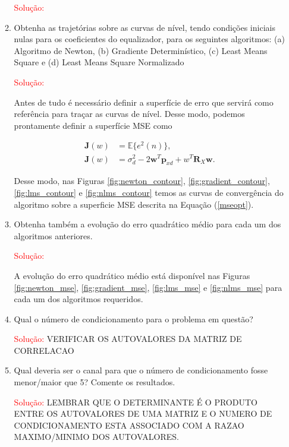 \documentclass[a4paper,10pt]{article}
\begin{document}
\begin{enumerate}
\begin{enumerate}
						\textcolor{red}{Solução:}
					
					\newpage
					\item Obtenha as trajetórias sobre as curvas de nível, tendo condições iniciais nulas para os coeﬁcientes do equalizador, para os seguintes algoritmos: (a) Algoritmo de Newton, (b) Gradiente Determinístico, (c) Least Means Square e (d) Least Means Square Normalizado
						
						\textcolor{red}{Solução:}
						
						Antes de tudo é necessário definir a superfície de erro que servirá como referência para traçar as curvas de nível. Desse modo, podemos prontamente
						definir a superfície MSE como
						
						\begin{align}
							\mathbf{J}(w) &= \mathbb{E}\{e^{2}(n)\}, \\
							\mathbf{J}(w) &= \sigma^{2}_{d} - 2\mathbf{w}^{T}\mathbf{p}_{xd} + w^{T}\mathbf{R}_{X}\mathbf{w}. \label{mseopt}  
						\end{align}
						
						Desse modo, nas Figuras \ref{fig:newton_contour}, \ref{fig:gradient_contour}, \ref{fig:lms_contour} e \ref{fig:nlms_contour} temos as curvas de convergência do algoritmo sobre a superficie MSE descrita na Equação (\ref{mseopt}). 

					\item Obtenha também a evolução do erro quadrático médio para cada um dos algoritmos anteriores.
						
						\textcolor{red}{Solução:}

						A evolução do erro quadrático médio está disponível nas Figuras \ref{fig:newton_mse}, \ref{fig:gradient_mse}, \ref{fig:lms_mse} e \ref{fig:nlms_mse} para cada um dos algoritmos requeridos.
					\item Qual o número de condicionamento para o problema em questão?
					
						\textcolor{red}{Solução:}
						VERIFICAR OS AUTOVALORES DA MATRIZ DE CORRELACAO
					
					\item Qual deveria ser o canal para que o número de condicionamento fosse menor/maior que 5?
					Comente os resultados.
					
						\textcolor{red}{Solução:}
						LEMBRAR QUE O DETERMINANTE É O PRODUTO ENTRE OS AUTOVALORES DE UMA MATRIZ E O NUMERO DE CONDICIONAMENTO ESTA ASSOCIADO COM A RAZAO MAXIMO/MINIMO DOS AUTOVALORES.
						

\end{enumerate}
\end{enumerate}
\end{document}
